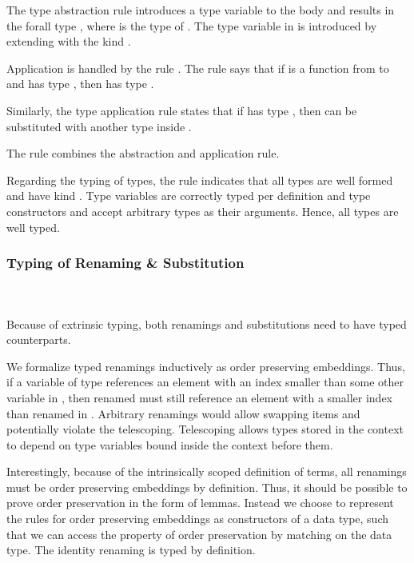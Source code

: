 \noindent The type abstraction rule  introduces a type variable to the body  and results in the forall type  , where  is the type of . 
The type variable in  is introduced by extending  with the kind . 

\noindent Application is handled by the rule . 
The rule says that if  is a function from  to  and  has type , then    has type . 

\noindent Similarly, the type application rule  states that if  has type  , then \Sym{\alpha} can be substituted with another type  inside . 

\noindent The rule  combines the abstraction and application rule.

\noindent Regarding the typing of types, the rule  indicates that all types  are well formed and have kind . Type variables are correctly typed per definition and type constructors  and  accept arbitrary types as their arguments. Hence, all types are well typed.

\subsubsection{Typing of Renaming \& Substitution}\hfill\\\\
Because of extrinsic typing, both renamings and substitutions need to have typed counterparts.

\noindent We formalize typed renamings  inductively as order preserving embeddings. 
Thus, if a variable  of type    references an element with an index smaller than some other variable  in , then renamed  must still reference an element with a smaller index than renamed  in .
Arbitrary renamings would allow swapping items and potentially violate the telescoping. 
Telescoping allows types stored in the context to depend on type variables bound inside the context before them. 

\noindent Interestingly, because of the intrinsically scoped definition of terms, all renamings must be order preserving embeddings by definition. 
Thus, it should be possible to prove order preservation in the form of lemmas.
Instead we choose to represent the rules for order preserving embeddings as constructors of a data type, such that we can access the property of order preservation by matching on the data type.
\FRenTyping
The identity renaming  is typed by definition.

